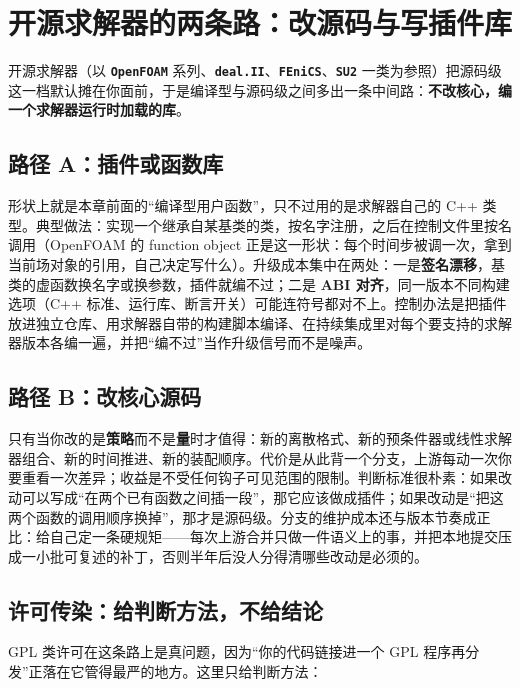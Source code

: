 \documentclass[12pt,a4paper,fontset=fandol]{ctexbook}
\newcommand{\Lib}[1]{\textbf{\texttt{#1}}}
\newcommand{\Lang}[1]{\textsf{#1}}
\newcommand{\CPP}{\Lang{C++}}
\begin{document}
\section{开源求解器的两条路：改源码与写插件库}
\label{sec:ch07-ossolver}

开源求解器（以 \Lib{OpenFOAM} 系列、\Lib{deal.II}、\Lib{FEniCS}、\Lib{SU2} 一类为参照）把源码级这一档默认摊在你面前，于是编译型与源码级之间多出一条中间路：\textbf{不改核心，编一个求解器运行时加载的库}。

\subsection*{路径 A：插件或函数库}

形状上就是本章前面的``编译型用户函数''，只不过用的是求解器自己的 \CPP{} 类型。典型做法：实现一个继承自某基类的类，按名字注册，之后在控制文件里按名调用（OpenFOAM 的 function object 正是这一形状：每个时间步被调一次，拿到当前场对象的引用，自己决定写什么）。升级成本集中在两处：一是\textbf{签名漂移}，基类的虚函数换名字或换参数，插件就编不过；二是 \textbf{ABI 对齐}，同一版本不同构建选项（C++ 标准、运行库、断言开关）可能连符号都对不上。控制办法是把插件放进独立仓库、用求解器自带的构建脚本编译、在持续集成里对每个要支持的求解器版本各编一遍，并把``编不过''当作升级信号而不是噪声。

\subsection*{路径 B：改核心源码}

只有当你改的是\textbf{策略}而不是\textbf{量}时才值得：新的离散格式、新的预条件器或线性求解器组合、新的时间推进、新的装配顺序。代价是从此背一个分支，上游每动一次你要重看一次差异；收益是不受任何钩子可见范围的限制。判断标准很朴素：如果改动可以写成``在两个已有函数之间插一段''，那它应该做成插件；如果改动是``把这两个函数的调用顺序换掉''，那才是源码级。分支的维护成本还与版本节奏成正比：给自己定一条硬规矩——每次上游合并只做一件语义上的事，并把本地提交压成一小批可复述的补丁，否则半年后没人分得清哪些改动是必须的。

\subsection*{许可传染：给判断方法，不给结论}

GPL 类许可在这条路上是真问题，因为``你的代码链接进一个 GPL 程序再分发''正落在它管得最严的地方。这里只给判断方法：
\end{document}
